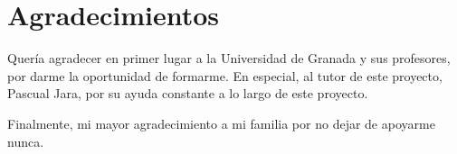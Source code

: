 

\begingroup
\let\clearpage\relax
\let\cleardoublepage\relax
\let\cleardoublepage\relax
\chapter*{Agradecimientos}

Quería agradecer en primer lugar a la Universidad de Granada y sus profesores, por darme la oportunidad de formarme. En especial, al tutor de este proyecto, Pascual Jara, por su ayuda constante a lo largo de este proyecto.

\bigskip

Finalmente, mi mayor agradecimiento a mi familia por no dejar de apoyarme nunca.

\endgroup
